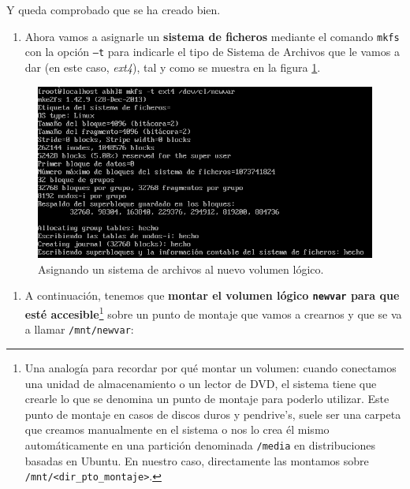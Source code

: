 \documentclass[
]{memoir}
\providecommand{\tightlist}{%
  \setlength{\itemsep}{0pt}\setlength{\parskip}{0pt}}
\begin{document}
Y queda comprobado que se ha creado bien.

\begin{enumerate}
\def\labelenumi{\arabic{enumi}.}
\setcounter{enumi}{6}
\tightlist
\item
  Ahora vamos a asignarle un \textbf{sistema de ficheros} mediante el comando \texttt{mkfs} con la opción \texttt{–t} para indicarle el tipo de Sistema de Archivos que le vamos a dar (en este caso, \emph{ext4}), tal y como se muestra en la figura \ref{fig:g}.
\end{enumerate}

\begin{figure}

{\centering \includegraphics[width=0.8\linewidth]{images/g} 

}

\caption{Asignando un sistema de archivos al nuevo volumen lógico.}\label{fig:g}
\end{figure}

\begin{enumerate}
\def\labelenumi{\arabic{enumi}.}
\setcounter{enumi}{7}
\tightlist
\item
  A continuación, tenemos que \textbf{montar el volumen lógico \texttt{newvar} para que esté accesible}\footnote{Una analogía para recordar por qué montar un volumen: cuando conectamos una unidad de almacenamiento o un lector de DVD, el sistema tiene que crearle lo que se denomina un punto de montaje para poderlo utilizar. Este punto de montaje en casos de discos duros y pendrive's, suele ser una carpeta que creamos manualmente en el sistema o nos lo crea él mismo automáticamente en una partición denominada \texttt{/media} en distribuciones basadas en Ubuntu. En nuestro caso, directamente las montamos sobre \texttt{/mnt/\textless{}dir\_pto\_montaje\textgreater{}}.} sobre un punto de montaje que vamos a crearnos y que se va a llamar \texttt{/mnt/newvar}:
\end{enumerate}
\end{document}

